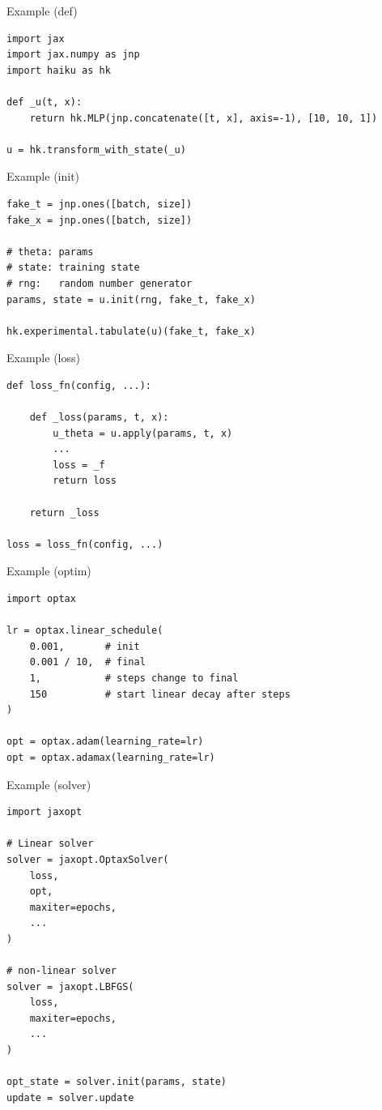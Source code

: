 \documentclass[aspectratio=1610,xcolor={dvipsnames},hyperref={colorlinks,unicode,linkcolor=violet,anchorcolor=BlueViolet,citecolor=YellowOrange,filecolor=black,urlcolor=Aquamarine}]{beamer}
\begin{document}
\begin{frame}[label={sec:org3a45c15},fragile,containsverbatim]{Example (def)}
 \begin{verbatim}
import jax
import jax.numpy as jnp
import haiku as hk

def _u(t, x):
    return hk.MLP(jnp.concatenate([t, x], axis=-1), [10, 10, 1])

u = hk.transform_with_state(_u)
\end{verbatim}
\end{frame}

\begin{frame}[label={sec:orga431a8a},fragile,containsverbatim]{Example (init)}
 \begin{verbatim}
fake_t = jnp.ones([batch, size])
fake_x = jnp.ones([batch, size])

# theta: params
# state: training state
# rng:   random number generator
params, state = u.init(rng, fake_t, fake_x)

hk.experimental.tabulate(u)(fake_t, fake_x)
\end{verbatim}
\end{frame}

\begin{frame}[label={sec:org8353a74},fragile,containsverbatim]{Example (loss)}
 \begin{verbatim}
def loss_fn(config, ...):

    def _loss(params, t, x):
        u_theta = u.apply(params, t, x)
        ...
        loss = _f
        return loss

    return _loss

loss = loss_fn(config, ...)
\end{verbatim}
\end{frame}

\begin{frame}[label={sec:org0956445},fragile,containsverbatim]{Example (optim)}
 \begin{verbatim}
import optax

lr = optax.linear_schedule(
    0.001,       # init
    0.001 / 10,  # final
    1,           # steps change to final
    150          # start linear decay after steps
)

opt = optax.adam(learning_rate=lr)
opt = optax.adamax(learning_rate=lr)
\end{verbatim}
\end{frame}

\begin{frame}[label={sec:org2707e04},fragile,containsverbatim]{Example (solver)}
 \begin{verbatim}
import jaxopt

# Linear solver
solver = jaxopt.OptaxSolver(
    loss,
    opt,
    maxiter=epochs,
    ...
)

# non-linear solver
solver = jaxopt.LBFGS(
    loss,
    maxiter=epochs,
    ...
)

opt_state = solver.init(params, state)
update = solver.update
\end{verbatim}
\end{frame}
\end{document}
